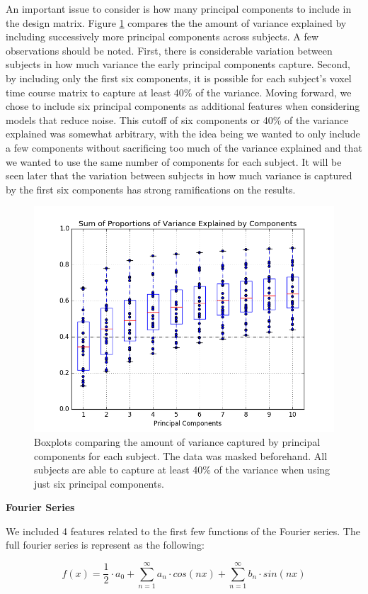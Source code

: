 An important issue to consider is how many principal components to include in 
the design matrix. Figure \ref{fig:pcabox} compares the the amount of variance 
explained by including successively more principal components across subjects. 
A few observations should be noted. First, there is considerable variation 
between subjects in how much variance the early principal components capture. 
Second, by including only the first six components, it is possible for each 
subject's voxel time course matrix to capture at least 40\% of the variance. 
Moving forward, we chose to include six principal components as additional 
features when considering models that reduce noise. This cutoff of six 
components or 40\% of the variance explained was somewhat arbitrary, with the 
idea being we wanted to only include a few components without sacrificing too 
much of the variance explained and that we wanted to use the same number of 
components for each subject. It will be seen later that the variation between 
subjects in how much variance is captured by the first six components has strong 
ramifications on the results. 

\begin{figure}[ht]
	\centering
	\includegraphics[width=.5\linewidth]{../images/pcaBOX.png}
 	\caption{Boxplots comparing the amount of variance captured by principal 
components for each subject. The data was masked beforehand. All subjects are 
able to capture at least 40\% of the variance when using just six principal 
components.}
 	\label{fig:pcabox}
\end{figure}


\vspace{2mm}
\noindent \textbf{Fourier Series}
\vspace{2mm}
\par We included 4 features related to the first few functions of the Fourier series.
The full fourier series is represent as the following:

\begin{equation}
f(x) = \frac{1}{2} \cdot a_0 + \sum_{n=1}^{\infty} a_n \cdot cos(n x) + \sum_{n=1}^{\infty} b_n \cdot  sin(n x)
\end{equation}

